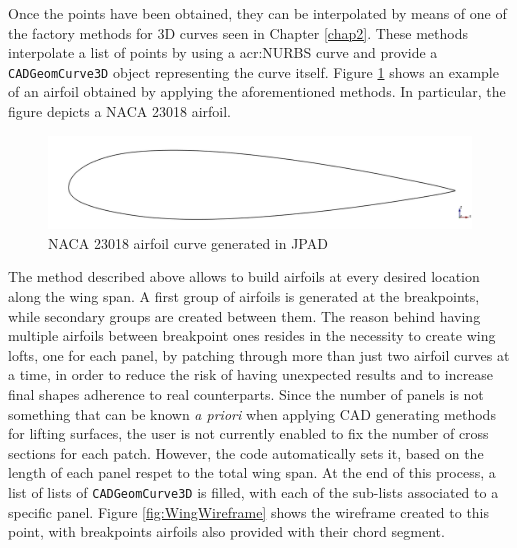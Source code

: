 \bigskip
\noindent
Once the points have been obtained, they can be interpolated by means of one of the factory methods for 3D curves seen in Chapter \ref{chap2}. These methods interpolate a list of points by using a \gls{acr:NURBS} curve and provide a \lstinline[language=Java]!CADGeomCurve3D! object representing the curve itself. Figure \ref{fig:AirfoilSample} shows an example of an airfoil obtained by applying the aforementioned methods. In particular, the figure depicts a NACA 23018 airfoil.
%
\begin{figure}[H]
\centering
\includegraphics[scale=0.28]{Immagini/Capitolo3/WingAirfoil}
\caption{NACA 23018 airfoil curve generated in JPAD}
\label{fig:AirfoilSample}
\end{figure}
%
\noindent
The method described above allows to build airfoils at every desired location along the wing span. A first group of airfoils is generated at the breakpoints, while secondary groups are created between them. The reason behind having multiple airfoils between breakpoint ones resides in the necessity to create wing lofts, one for each panel, by patching through more than just two airfoil curves at a time, in order to reduce the risk of having unexpected results and to increase final shapes adherence to real counterparts. Since the number of panels is not something that can be known \emph{a priori} when applying \gls{CAD} generating methods for lifting surfaces, the user is not currently enabled to fix the number of cross sections for each patch. However, the code automatically sets it, based on the length of each panel respet to the total wing span. At the end of this process, a list of lists of \lstinline[language=Java]!CADGeomCurve3D! is filled, with each of the sub-lists associated to a specific panel. Figure \ref{fig:WingWireframe} shows the wireframe created to this point, with breakpoints airfoils also provided with their chord segment.
%

